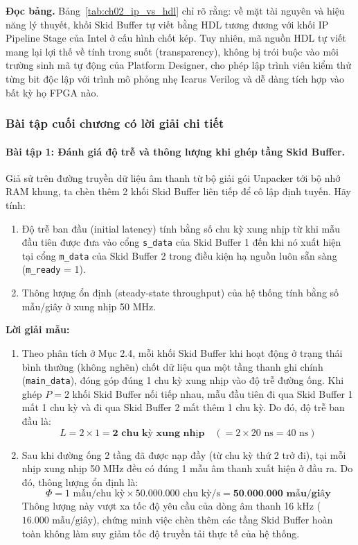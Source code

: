 \textbf{Đọc bảng.} Bảng~\ref{tab:ch02_ip_vs_hdl} chỉ rõ rằng: về mặt tài nguyên và hiệu năng lý thuyết, khối Skid Buffer tự viết bằng HDL tương đương với khối IP Pipeline Stage của Intel ở cấu hình chốt kép. Tuy nhiên, mã nguồn HDL tự viết mang lại lợi thế về tính trong suốt (transparency), không bị trói buộc vào môi trường sinh mã tự động của Platform Designer, cho phép lập trình viên kiểm thử từng bit độc lập với trình mô phỏng nhẹ Icarus Verilog và dễ dàng tích hợp vào bất kỳ họ FPGA nào.

\subsubsection*{Bài tập cuối chương có lời giải chi tiết}

\paragraph{Bài tập 1: Đánh giá độ trễ và thông lượng khi ghép tầng Skid Buffer.}
Giả sử trên đường truyền dữ liệu âm thanh từ bộ giải gói Unpacker tới bộ nhớ RAM khung, ta chèn thêm 2 khối Skid Buffer liên tiếp để cô lập định tuyến. Hãy tính:
\begin{enumerate}[label=(\alph*)]
    \item Độ trễ ban đầu (initial latency) tính bằng số chu kỳ xung nhịp từ khi mẫu đầu tiên được đưa vào cổng \texttt{s\_data} của Skid Buffer 1 đến khi nó xuất hiện tại cổng \texttt{m\_data} của Skid Buffer 2 trong điều kiện hạ nguồn luôn sẵn sàng (\texttt{m\_ready} = 1).
    \item Thông lượng ổn định (steady-state throughput) của hệ thống tính bằng số mẫu/giây ở xung nhịp 50 MHz.
\end{enumerate}

\textbf{Lời giải mẫu:}
\begin{enumerate}[label=(\alph*)]
    \item Theo phân tích ở Mục 2.4, mỗi khối Skid Buffer khi hoạt động ở trạng thái bình thường (không nghẽn) chốt dữ liệu qua một tầng thanh ghi chính (\texttt{main\_data}), đóng góp đúng 1 chu kỳ xung nhịp vào độ trễ đường ống. Khi ghép $P = 2$ khối Skid Buffer nối tiếp nhau, mẫu đầu tiên đi qua Skid Buffer 1 mất 1 chu kỳ và đi qua Skid Buffer 2 mất thêm 1 chu kỳ. Do đó, độ trễ ban đầu là:
    \begin{equation}
    L = 2 \times 1 = \textbf{2 chu kỳ xung nhịp} \quad (= 2 \times 20\text{ ns} = 40\text{ ns})
    \end{equation}
    \item Sau khi đường ống 2 tầng đã được nạp đầy (từ chu kỳ thứ 2 trở đi), tại mỗi nhịp xung nhịp 50 MHz đều có đúng 1 mẫu âm thanh xuất hiện ở đầu ra. Do đó, thông lượng ổn định là:
    \begin{equation}
    \Phi = 1\text{ mẫu/chu kỳ} \times 50.000.000\text{ chu kỳ/s} = \textbf{50.000.000 mẫu/giây}
    \end{equation}
    Thông lượng này vượt xa tốc độ yêu cầu của dòng âm thanh 16 kHz ($16.000\text{ mẫu/giây}$), chứng minh việc chèn thêm các tầng Skid Buffer hoàn toàn không làm suy giảm tốc độ truyền tải thực tế của hệ thống.
\end{enumerate}

